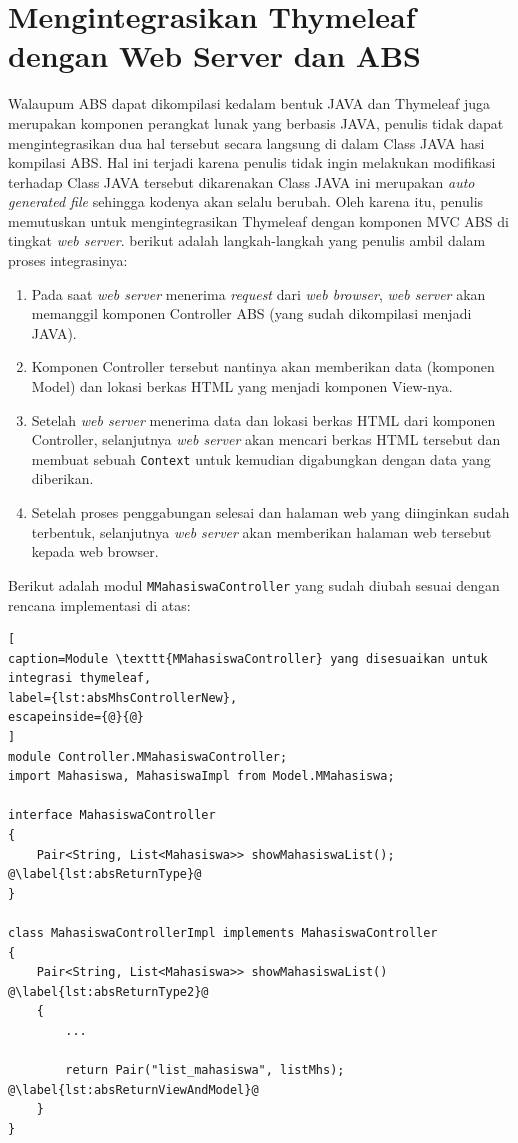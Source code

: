 \section{Mengintegrasikan Thymeleaf dengan Web Server dan ABS}

Walaupum ABS dapat dikompilasi kedalam bentuk JAVA dan Thymeleaf juga merupakan komponen perangkat lunak yang berbasis JAVA, penulis tidak dapat mengintegrasikan dua hal tersebut secara langsung di dalam Class JAVA hasi kompilasi ABS. Hal ini terjadi karena penulis tidak ingin melakukan modifikasi terhadap Class JAVA tersebut dikarenakan Class JAVA ini merupakan \textit{auto generated file} sehingga kodenya akan selalu berubah. Oleh karena itu, penulis memutuskan untuk mengintegrasikan Thymeleaf dengan komponen MVC ABS di tingkat \textit{web server}. berikut adalah langkah-langkah yang penulis ambil dalam proses integrasinya:

\begin{enumerate}
    \item Pada saat \textit{web server} menerima \textit{request} dari \textit{web browser}, \textit{web server} akan memanggil komponen Controller ABS (yang sudah dikompilasi menjadi JAVA).
    \item Komponen Controller tersebut nantinya akan memberikan data (komponen Model) dan lokasi berkas HTML yang menjadi komponen View-nya.
    \item Setelah \textit{web server} menerima data dan lokasi berkas HTML dari komponen Controller, selanjutnya \textit{web server} akan mencari berkas HTML tersebut dan membuat sebuah \texttt{Context} untuk kemudian digabungkan dengan data yang diberikan.
    \item Setelah proses penggabungan selesai dan halaman web yang diinginkan sudah terbentuk, selanjutnya \textit{web server} akan memberikan halaman web tersebut kepada web browser.
\end{enumerate}

Berikut adalah modul \texttt{MMahasiswaController} yang sudah diubah sesuai dengan rencana implementasi di atas:

\begin{lstlisting}[
caption=Module \texttt{MMahasiswaController} yang disesuaikan untuk integrasi thymeleaf,
label={lst:absMhsControllerNew},
escapeinside={@}{@}
]
module Controller.MMahasiswaController;
import Mahasiswa, MahasiswaImpl from Model.MMahasiswa;

interface MahasiswaController
{
	Pair<String, List<Mahasiswa>> showMahasiswaList(); @\label{lst:absReturnType}@
}

class MahasiswaControllerImpl implements MahasiswaController
{
	Pair<String, List<Mahasiswa>> showMahasiswaList() @\label{lst:absReturnType2}@
	{
		...
		
		return Pair("list_mahasiswa", listMhs); @\label{lst:absReturnViewAndModel}@
	}
}
\end{lstlisting}

